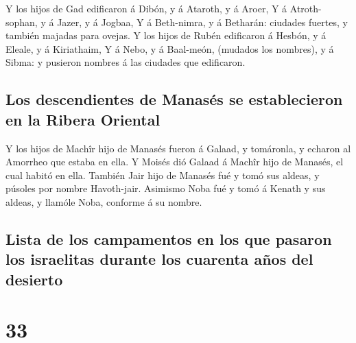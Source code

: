  Y los hijos de Gad edificaron á Dibón, y á Ataroth, y á
Aroer,  Y á Atroth-sophan, y á Jazer, y á Jogbaa,
 Y á Beth-nimra, y á Betharán: ciudades fuertes, y
también majadas para ovejas.  Y los hijos de Rubén
edificaron á Hesbón, y á Eleale, y á Kiriathaim,  Y á
Nebo, y á Baal-meón, (mudados los nombres), y á Sibma: y pusieron
nombres á las ciudades que edificaron.

\hypertarget{los-descendientes-de-manasuxe9s-se-establecieron-en-la-ribera-oriental}{%
\subsection{Los descendientes de Manasés se establecieron en la Ribera
Oriental}\label{los-descendientes-de-manasuxe9s-se-establecieron-en-la-ribera-oriental}}

 Y los hijos de Machîr hijo de Manasés fueron á Galaad, y
tomáronla, y echaron al Amorrheo que estaba en ella.  Y
Moisés dió Galaad á Machîr hijo de Manasés, el cual habitó en ella.
 También Jair hijo de Manasés fué y tomó sus aldeas, y
púsoles por nombre Havoth-jair.  Asimismo Noba fué y tomó
á Kenath y sus aldeas, y llamóle Noba, conforme á su nombre.

\hypertarget{lista-de-los-campamentos-en-los-que-pasaron-los-israelitas-durante-los-cuarenta-auxf1os-del-desierto}{%
\subsection{Lista de los campamentos en los que pasaron los israelitas
durante los cuarenta años del
desierto}\label{lista-de-los-campamentos-en-los-que-pasaron-los-israelitas-durante-los-cuarenta-auxf1os-del-desierto}}

\hypertarget{section-32}{%
\section{33}\label{section-32}}


